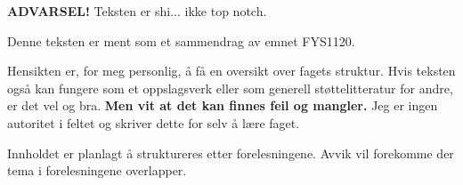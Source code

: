\textbf{ADVARSEL!} Teksten er shi... ikke top notch.

Denne teksten er ment som et sammendrag av emnet FYS1120.

Hensikten er, for meg personlig, å få en oversikt over fagets struktur.
Hvis teksten også kan fungere som et oppslagsverk eller som generell
støttelitteratur for andre, er det vel og bra.
\textbf{Men vit at det kan finnes feil og mangler.}
Jeg er ingen autoritet i feltet og skriver dette for selv å lære faget.

Innholdet er planlagt å struktureres etter forelesningene.
Avvik vil forekomme der tema i forelesningene overlapper.
